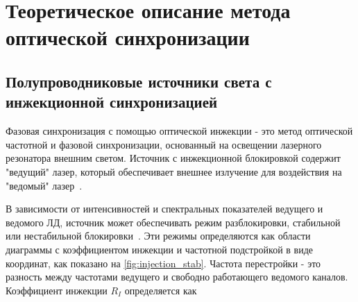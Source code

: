 \section{Теоретическое описание метода оптической синхронизации}
\label{sec:theory}

\subsection{Полупроводниковые источники света с инжекционной синхронизацией}

Фазовая синхронизация с помощью оптической инжекции - это метод оптической частотной и фазовой синхронизации, основанный на освещении лазерного резонатора внешним светом. Источник с инжекционной блокировкой содержит "ведущий" лазер, который обеспечивает внешнее излучение для воздействия на "ведомый" лазер~\cite{liu2020}. 

В зависимости от интенсивностей и спектральных показателей ведущего и ведомого ЛД, источник может обеспечивать режим разблокировки, стабильной или нестабильной блокировки~\cite{lau2008}. Эти режимы определяются как области диаграммы с коэффициентом инжекции и частотной подстройкой в виде координат, как показано на \cref{fig:injection_stab}. Частота перестройки - это разность между частотами ведущего и свободно работающего ведомого каналов. Коэффициент инжекции $R_I$ определяется как 

